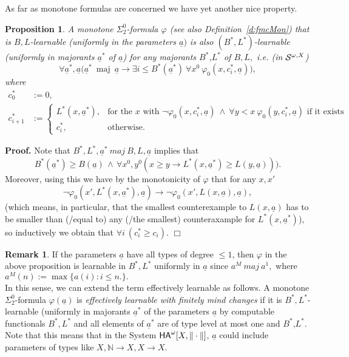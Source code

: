 \documentclass[1p]{elsarticle}
\newcommand{\usftext}[1]{\textsf{\upshape #1}}
\newcommand{\NN}{\ensuremath{\mathbb{N}}}
\DeclareMathOperator{\maj}{maj} %
\newcommand{\ha}{\ensuremath{{\usftext{HA}}^\omega}} %
\newcommand{\tup}{\underline} %
\newcommand{\Telse}{\text{otherwise}}
\theoremstyle{plain}
\newtheorem{prop}[thm]{Proposition}
\theoremstyle{definition}
\newtheorem{rmk}[thm]{Remark}
\theoremstyle{remark}
\renewcommand{\phi}{\varphi}
\theoremstyle{definition}
\begin{document}
As far as monotone formulas are concerned we have yet another nice property.
\begin{prop}\label{p:majBL}
A monotone $\Sigma^0_2$-formula $\phi$ (see also Definition~\ref{d:fmcMon}) that is $B,L$-learnable (uniformly in the parameters $\underline{a})$ 
is also $(B^*,L^*)$-learnable (uniformly in majorants $\tup a^*$ of 
$\tup a$) for any majorants $B^*$,$L^*$ of $B,L,$ i.e. 
(in ${\cal S}^{\omega,X}$)  
\[ \forall 
\underline{a}^*,\underline{a} \big( 
\underline{a}^* \ \maj\ \underline{a}\to 
\exists i\leq B^*(\tup a^*)\ \forall x^0\ \phi_0(x,c^*_i,\tup a)\big),\] where
\begin{align*}
c^*_0&:=0,\\
c^*_{i+1}&:=
\begin{cases}
L^*(x, \tup a^*),&\text{for the $x$ with } \neg\phi_0(x,c^*_i,\tup a)\ \wedge\ \forall y<x\ \phi_0(y,c^*_i,\tup a) \text{ if it exists}\\
c^*_i,&\Telse.
\end{cases}
\end{align*}
\end{prop}
{\bf Proof.} Note that $B^*,L^*,\tup a^* \ maj \ B,L,\tup a$ implies that 
\[ B^*(\underline{a}^*) \ge B(\underline{a}) \,\wedge\,\forall x^0,y^0 
(x\ge y\to L^*(x,\underline{a}^*)\ge L(y,\underline{a}))).\] 
Moreover, using this we have by the monotonicity of $\varphi$ that for any $x,x'$
\[ \neg \phi_0(x',L^*(x,\underline{a}^*),\tup a) \rightarrow \neg \phi_0(x',L(x,\underline{a}),\tup a), \]
(which means, in particular, that the smallest counterexample to $L(x,\underline{a})$ has to be smaller than (/equal to) any (/the smallest) counteraxample for $L^*(x,\underline{a}^*)$),\\
so inductively we obtain that $\forall i\ (c^*_i\geq c_i)$. \hfill $\Box$
\begin{rmk} If the parameters $\underline{a}$ have all types of degree 
$\le 1$, then $\varphi$ in the above proposition is learnable in $B^*,L^*$ 
uniformly in $\underline{a}$ since $a^M \ maj \ a^1,$ where 
$a^M(n):=\max\{ a(i):i\le n.\}.$
\\ In this sense, we can extend the term effectively learnable as follows. A monotone $\Sigma^0_2$-formula $\phi(\tup a)$ is 
{\em effectively learnable with finitely mind changes} if it is 
$B^*,L^*$-learnable (uniformly in majorants $\underline{a}^*$ of the 
parameters $\underline{a}$ by computable functionals $B^*,L^*$ and all elements of $\tup a^*$ are of type level at most one and $B^*$,$L^*.$ 
Note that this means that in the System $\ha[X,\|\cdot\|]$, $\tup a$ could include parameters of types like $X,\NN\to X,X\to X$.
\end{rmk}
\end{document}
